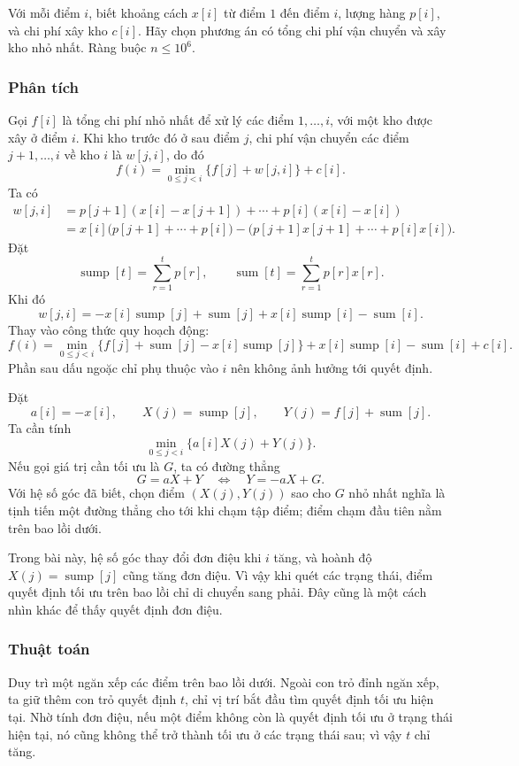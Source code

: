 \documentclass[11pt]{article}
\newcommand{\sump}{\operatorname{sump}}
\newcommand{\sumx}{\operatorname{sum}}
\begin{document}
Với mỗi điểm $i$, biết khoảng cách $x[i]$ từ điểm $1$ đến điểm $i$, lượng
hàng $p[i]$, và chi phí xây kho $c[i]$. Hãy chọn phương án có tổng chi phí
vận chuyển và xây kho nhỏ nhất. Ràng buộc $n\le 10^6$.

\subsubsection*{Phân tích}

Gọi $f[i]$ là tổng chi phí nhỏ nhất để xử lý các điểm $1,\ldots,i$, với một
kho được xây ở điểm $i$. Khi kho trước đó ở sau điểm $j$, chi phí vận chuyển
các điểm $j+1,\ldots,i$ về kho $i$ là $w[j,i]$, do đó
\[
  f(i)=\min_{0\le j<i}\{f[j]+w[j,i]\}+c[i].
\]
Ta có
\[
\begin{aligned}
  w[j,i]
  &=p[j+1](x[i]-x[j+1])+\cdots+p[i](x[i]-x[i])\\
  &=x[i]\bigl(p[j+1]+\cdots+p[i]\bigr)
    -\bigl(p[j+1]x[j+1]+\cdots+p[i]x[i]\bigr).
\end{aligned}
\]
Đặt
\[
  \sump[t]=\sum_{r=1}^{t}p[r],
  \qquad
  \sumx[t]=\sum_{r=1}^{t}p[r]x[r].
\]
Khi đó
\[
  w[j,i]
  =-x[i]\sump[j]+\sumx[j]
   +x[i]\sump[i]-\sumx[i].
\]
Thay vào công thức quy hoạch động:
\[
  f(i)=
  \min_{0\le j<i}\{f[j]+\sumx[j]-x[i]\sump[j]\}
  +x[i]\sump[i]-\sumx[i]+c[i].
\]
Phần sau dấu ngoặc chỉ phụ thuộc vào $i$ nên không ảnh hưởng tới quyết định.

Đặt
\[
  a[i]=-x[i],\qquad X(j)=\sump[j],\qquad Y(j)=f[j]+\sumx[j].
\]
Ta cần tính
\[
  \min_{0\le j<i}\{a[i]X(j)+Y(j)\}.
\]
Nếu gọi giá trị cần tối ưu là $G$, ta có đường thẳng
\[
  G=aX+Y
  \quad\Longleftrightarrow\quad
  Y=-aX+G.
\]
Với hệ số góc đã biết, chọn điểm $(X(j),Y(j))$ sao cho $G$ nhỏ nhất nghĩa là
tịnh tiến một đường thẳng cho tới khi chạm tập điểm; điểm chạm đầu tiên nằm
trên bao lồi dưới.

Trong bài này, hệ số góc thay đổi đơn điệu khi $i$ tăng, và hoành độ
$X(j)=\sump[j]$ cũng tăng đơn điệu. Vì vậy khi quét các trạng thái, điểm
quyết định tối ưu trên bao lồi chỉ di chuyển sang phải. Đây cũng là một cách
nhìn khác để thấy quyết định đơn điệu.

\subsubsection*{Thuật toán}

Duy trì một ngăn xếp các điểm trên bao lồi dưới. Ngoài con trỏ đỉnh ngăn xếp,
ta giữ thêm con trỏ quyết định $t$, chỉ vị trí bắt đầu tìm quyết định tối ưu
hiện tại. Nhờ tính đơn điệu, nếu một điểm không còn là quyết định tối ưu ở
trạng thái hiện tại, nó cũng không thể trở thành tối ưu ở các trạng thái sau;
vì vậy $t$ chỉ tăng.
\end{document}
